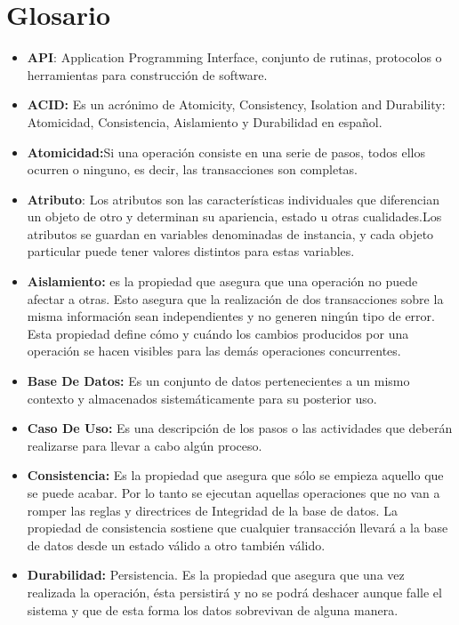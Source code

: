 \newpage
\section*{Glosario}
\begin{itemize}
	\item \textbf{API}: Application Programming Interface, conjunto de rutinas, protocolos o herramientas para construcción de software.
	\item \textbf{ACID:} Es un acrónimo de Atomicity, Consistency, Isolation and Durability: Atomicidad, Consistencia, Aislamiento y Durabilidad en español.
	\item \textbf{Atomicidad:}Si una operación consiste en una serie de pasos, todos ellos ocurren o ninguno, es decir, las transacciones son completas.
	      	        
	\item \textbf{Atributo}: Los atributos son las características individuales que diferencian un objeto de otro y determinan su apariencia, estado u otras cualidades.Los atributos se guardan en variables denominadas de instancia, y cada objeto particular puede tener valores distintos para estas variables.
	\item \textbf{Aislamiento:} es la propiedad que asegura que una operación no puede afectar a otras. Esto asegura que la realización de dos transacciones sobre la misma información sean independientes y no generen ningún tipo de error.  Esta propiedad define cómo y cuándo los cambios producidos por una operación se hacen visibles para las demás operaciones concurrentes.
	\item \textbf{Base De Datos:} Es un conjunto de datos pertenecientes a un mismo contexto y almacenados sistemáticamente para su posterior uso.
	\item  \textbf{Caso De Uso:} Es una descripción de los pasos o las actividades que deberán realizarse para llevar a cabo algún proceso. 
	\item \textbf{Consistencia:} Es la propiedad que asegura que sólo se empieza aquello que se puede acabar. Por lo tanto se ejecutan aquellas operaciones que no van a romper las reglas y directrices de Integridad de la base de datos. La propiedad de consistencia sostiene que cualquier transacción llevará a la base de datos desde un estado válido a otro también válido. 
	\item \textbf{Durabilidad:} Persistencia. Es la propiedad que asegura que una vez realizada la operación, ésta persistirá y no se podrá deshacer aunque falle el sistema y que de esta forma los datos sobrevivan de alguna manera.

\end{itemize}
